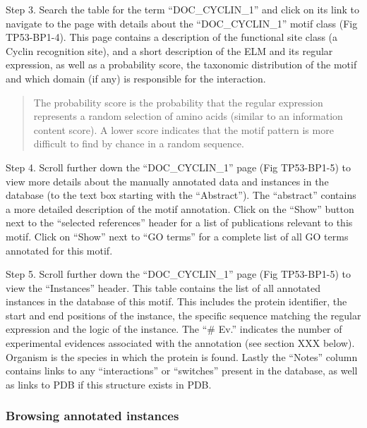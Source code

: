 Step 3. Search the table for the term ``DOC\_CYCLIN\_1'' and click on
its link to navigate to the page with details about the
``DOC\_CYCLIN\_1'' motif class (Fig TP53-BP1-4). This page contains a
description of the functional site class (a Cyclin recognition site),
and a short description of the ELM and its regular expression, as well
as a probability score, the taxonomic distribution of the motif and
which domain (if any) is responsible for the interaction.

\begin{quote}
The probability score is the probability that the regular expression
represents a random selection of amino acids (similar to an information
content score). A lower score indicates that the motif pattern is more
difficult to find by chance in a random sequence.
\end{quote}

Step 4. Scroll further down the ``DOC\_CYCLIN\_1'' page (Fig TP53-BP1-5)
to view more details about the manually annotated data and instances in
the database (to the text box starting with the ``Abstract''). The
``abstract'' contains a more detailed description of the motif
annotation. Click on the ``Show'' button next to the ``selected
references'' header for a list of publications relevant to this motif.
Click on ``Show'' next to ``GO terms'' for a complete list of all GO
terms annotated for this motif.

Step 5. Scroll further down the ``DOC\_CYCLIN\_1'' page (Fig TP53-BP1-5)
to view the ``Instances'' header. This table contains the list of all
annotated instances in the database of this motif. This includes the
protein identifier, the start and end positions of the instance, the
specific sequence matching the regular expression and the logic of the
instance. The ``\# Ev.'' indicates the number of experimental evidences
associated with the annotation (see section XXX below). Organism is the
species in which the protein is found. Lastly the ``Notes'' column
contains links to any ``interactions'' or ``switches'' present in the
database, as well as links to PDB if this structure exists in PDB.

\subsubsection{Browsing annotated
instances}\label{browsing-annotated-instances}

